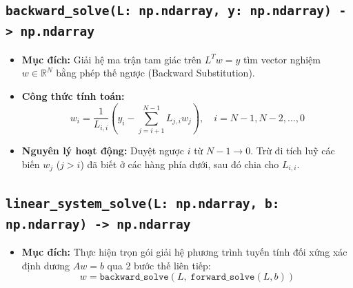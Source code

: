 \documentclass[12pt,a4paper]{article}
\begin{document}
\subsection{\texttt{backward\_solve(L: np.ndarray, y: np.ndarray) -> np.ndarray}}
\begin{itemize}[leftmargin=1.5em]
    \item \textbf{Mục đích:} Giải hệ ma trận tam giác trên $L^T w = y$ tìm vector nghiệm $w \in \mathbb{R}^N$ bằng phép thế ngược (Backward Substitution).
    \item \textbf{Công thức tính toán:}
    \begin{equation}
        w_i = \frac{1}{L_{i,i}} \left( y_i - \sum_{j=i+1}^{N-1} L_{j,i} w_j \right), \quad i = N-1, N-2, \dots, 0
    \end{equation}
    \item \textbf{Nguyên lý hoạt động:} Duyệt ngược $i$ từ $N-1 \to 0$. Trừ đi tích luỹ các biến $w_j$ ($j > i$) đã biết ở các hàng phía dưới, sau đó chia cho $L_{i,i}$.
\end{itemize}

\subsection{\texttt{linear\_system\_solve(L: np.ndarray, b: np.ndarray) -> np.ndarray}}
\begin{itemize}[leftmargin=1.5em]
    \item \textbf{Mục đích:} Thực hiện trọn gói giải hệ phương trình tuyến tính đối xứng xác định dương $A w = b$ qua 2 bước thế liên tiếp:
    \begin{equation}
        w = \texttt{backward\_solve}(L, \; \texttt{forward\_solve}(L, b))
    \end{equation}
\end{itemize}
\end{document}
